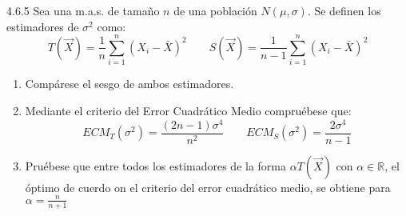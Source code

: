 \begin{problem}{4.6.5}
  Sea una m.a.s. de tamaño $n$ de una población $N(\mu, \sigma)$. Se definen los estimadores de $\sigma^2$ como:
  $$ T(\vec{X}) = \frac{1}{n} \sum_{i=1}^{n} (X_i - \bar{X})^2 \quad \quad S(\vec{X}) = \frac{1}{n - 1} \sum_{i=1}^{n} (X_i - \bar{X})^2 $$
  \begin{enumerate}
    \item Compárese el sesgo de ambos estimadores. 
    \item Mediante el criterio del Error Cuadrático Medio compruébese que: 
    $$ECM_T(\sigma^2) = \frac{(2n - 1)\sigma^4}{n^2} \quad \quad ECM_S(\sigma^2) = \frac{2\sigma^4}{n - 1}$$
    \item Pruébese que entre todos los estimadores de la forma $\alpha T(\vec{X})$ con $\alpha \in \mathbb{R}$, el óptimo de cuerdo on el criterio del error cuadrático medio, se obtiene para $\alpha = \frac{n}{n+1}$
  \end{enumerate}
\end{problem}

